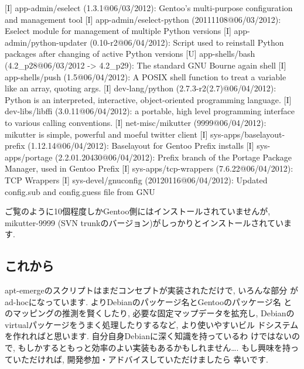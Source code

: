 \documentclass[mingoth,a4paper]{jsarticle}
\begin{document}
\begin{commandline}
[I] app-admin/eselect (1.3.1@06/03/2012): Gentoo's multi-purpose configuration and management tool
[I] app-admin/eselect-python (20111108@06/03/2012): Eselect module for management of multiple Python versions
[I] app-admin/python-updater (0.10-r2@06/04/2012): Script used to reinstall Python packages after changing of active Python versions
[U] app-shells/bash (4.2_p28@06/03/2012 -> 4.2_p29): The standard GNU Bourne again shell
[I] app-shells/push (1.5@06/04/2012): A POSIX shell function to treat a variable like an array, quoting args.
[I] dev-lang/python (2.7.3-r2(2.7)@06/04/2012): Python is an interpreted, interactive, object-oriented programming language.
[I] dev-libs/libffi (3.0.11@06/04/2012): a portable, high level programming interface to various calling conventions.
[I] net-misc/mikutter (9999@06/04/2012): mikutter is simple, powerful and moeful twitter client
[I] sys-apps/baselayout-prefix (1.12.14@06/04/2012): Baselayout for Gentoo Prefix installs
[I] sys-apps/portage (2.2.01.20430@06/04/2012): Prefix branch of the Portage Package Manager, used in Gentoo Prefix
[I] sys-apps/tcp-wrappers (7.6.22@06/04/2012): TCP Wrappers
[I] sys-devel/gnuconfig (20120116@06/04/2012): Updated config.sub and config.guess file from GNU
\end{commandline}

ご覧のように10個程度しかGentoo側にはインストールされていませんが,
mikutter-9999 (SVN trunkのバージョン)がしっかりとインストールされています.

\subsection{これから}

apt-emergeのスクリプトはまだコンセプトが実装されただけで, いろんな部分
がad-hocになっています. よりDebianのパッケージ名とGentooのパッケージ名
とのマッピングの推測を賢くしたり, 必要な固定マップデータを拡充し,
Debianのvirtualパッケージをうまく処理したりするなど, より使いやすいビル
ドシステムを作れればと思います. 自分自身Debianに深く知識を持っているわ
けではないので, もしかするともっと効率のよい実装もあるかもしれません….
もし興味を持っていただければ, 開発参加・アドバイスしていただけましたら
幸いです. 


\end{document}
